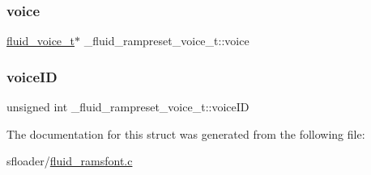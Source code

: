 \subsubsection{\texorpdfstring{voice}{voice}}
{\footnotesize\ttfamily \hyperlink{types_8h_a5123ae5ef2d7806475267380c33604c3}{fluid\+\_\+voice\+\_\+t}$\ast$ \+\_\+fluid\+\_\+rampreset\+\_\+voice\+\_\+t\+::voice}

\mbox{\label{struct__fluid__rampreset__voice__t_a82f4c1aadddb3c702648ac7b89be5649}} 
\subsubsection{\texorpdfstring{voice\+ID}{voiceID}}
{\footnotesize\ttfamily unsigned int \+\_\+fluid\+\_\+rampreset\+\_\+voice\+\_\+t\+::voice\+ID}



The documentation for this struct was generated from the following file\+:\begin{DoxyCompactItemize}
\item 
sfloader/\hyperlink{fluid__ramsfont_8c}{fluid\+\_\+ramsfont.\+c}\end{DoxyCompactItemize}
